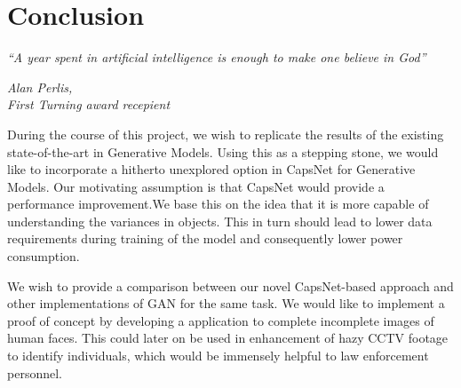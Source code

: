 \chapter{Conclusion}\label{ch:conclusion}
\epigraph{\textit{\Large “A year spent in artificial intelligence is enough to make one believe in God”}}{\textit{ \large Alan Perlis,\\ First Turning award recepient}}
During the course of this project, we wish to replicate the results of the existing state-of-the-art in Generative Models. Using this as a stepping stone, we would like to incorporate a hitherto unexplored option in CapsNet for Generative Models. Our motivating assumption is that CapsNet would provide a performance improvement.We base this on the idea that it is more capable of understanding the variances in objects. This in turn should lead to lower data requirements during training of the model and consequently lower power consumption. 

\par\bigskip We wish to provide a comparison between our novel CapsNet-based approach and other implementations of GAN for the same task. We would like to implement a proof of concept by developing a application to complete incomplete images of human faces. This could later on be used in enhancement of hazy CCTV footage to identify individuals, which would be immensely helpful to law enforcement personnel.